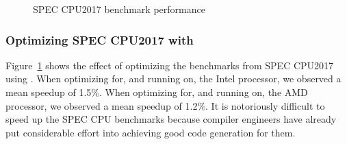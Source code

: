 \begin{figure}[tbp]
  \centering
  \hfill
  \caption{SPEC CPU2017 benchmark performance}
  \label{fig:spec}
\end{figure}

\subsubsection{Optimizing SPEC CPU2017 with \minotaur{}}

Figure~\ref{fig:spec} shows the effect of optimizing the benchmarks
from SPEC CPU2017 using \minotaur.
%
When optimizing for, and running on, the Intel processor, we observed
a mean speedup of 1.5\%.
%
When optimizing for, and running on, the AMD processor, we observed a
mean speedup of 1.2\%.
%
It is notoriously difficult to speed up the SPEC CPU benchmarks
because compiler engineers have already put considerable effort into
achieving good code generation for them.



